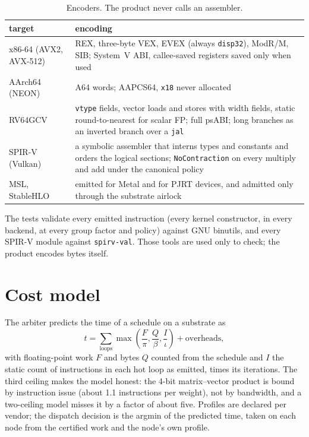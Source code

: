 \begin{table}[h]
\centering\small
\begin{tabularx}{\textwidth}{@{}lX@{}}
\toprule
target & encoding \\
\midrule
x86-64 (AVX2, AVX-512) & REX, three-byte VEX, EVEX (always \texttt{disp32}), ModR/M, SIB; System~V ABI, callee-saved registers saved only when used \\
AArch64 (NEON) & A64 words; AAPCS64, \texttt{x18} never allocated \\
RV64GCV & \texttt{vtype} fields, vector loads and stores with width fields, static round-to-nearest for scalar FP; full psABI; long branches as an inverted branch over a \texttt{jal} \\
SPIR-V (Vulkan) & a symbolic assembler that interns types and constants and orders the logical sections; \texttt{NoContraction} on every multiply and add under the canonical policy \\
MSL, StableHLO & emitted for Metal and for PJRT devices, and admitted only through the substrate airlock \\
\bottomrule
\end{tabularx}
\caption{Encoders. The product never calls an assembler.}
\end{table}

The tests validate every emitted instruction (every kernel constructor, in every backend, at every
group factor and policy) against GNU binutils, and every SPIR-V module against \texttt{spirv-val}.
Those tools are used only to check; the product encodes bytes itself.

\section{Cost model}

The arbiter predicts the time of a schedule on a substrate as
\[
  t = \sum_{\text{loops}} \max\!\left(\frac{F}{\pi}, \frac{Q}{\beta}, \frac{I}{\iota}\right) + \text{overheads},
\]
with floating-point work $F$ and bytes $Q$ counted from the schedule and $I$ the static count of
instructions in each hot loop as emitted, times its iterations. The third ceiling makes the model
honest: the 4-bit matrix--vector product is bound by instruction issue (about 1.1 instructions per
weight), not by bandwidth, and a two-ceiling model misses it by a factor of about five. Profiles are
declared per vendor; the dispatch decision is the argmin of the predicted time, taken on each node from
the certified work and the node's own profile.
